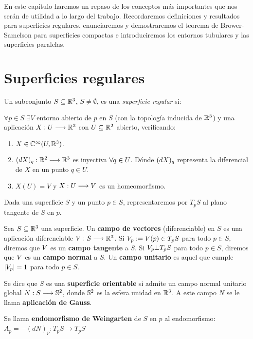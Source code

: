 \label{chapter:preliminary}
En este capítulo haremos un repaso de los conceptos más importantes que nos serán de utilidad a lo largo del trabajo. Recordaremos definiciones y resultados para superficies regulares, enunciaremos y demostraremos el teorema de Brower-Samelson para superficies compactas e introduciremos los entornos tubulares y las superficies paralelas.

\section{Superficies regulares}

\begin{definition}
Un subconjunto $S \subseteq \mathbb{R}^3$, $S \neq \emptyset$, es una \textit{superficie regular} si:

$\forall p \in S$ $\exists V$ entorno abierto de $p$ en $S$ (con la topología inducida de $\mathbb{R}^3$) y una aplicación $X: U \longrightarrow \mathbb{R}^3$ con $U \subseteq \mathbb{R}^2$ abierto, verificando:

\begin{enumerate}
    \item $X \in \mathbb{C}^\infty(U, \mathbb{R}^3)$.
    \item $(dX)_{q}: \mathbb{R}^2 \longrightarrow \mathbb{R}^3$ es inyectiva $\forall q \in U$. Dónde $(dX)_{q}$ representa la diferencial de $X$ en un punto $q \in U$.
    \item $X(U) = V$ y $X:U \longrightarrow V$ es un homeomorfismo.
\end{enumerate}
\end{definition}

Dada una superficie $S$ y un punto $p \in S$, representaremos por $T_pS$ al plano tangente de $S$ en $p$.

Sea $S \subseteq \mathbb{R}^3$ una superficie. Un \textbf{campo de vectores} (diferenciable) en $S$ es una aplicación diferenciable $V: S \longrightarrow \mathbb{R}^3$. Si $V_p := V(p) \in T_p S$ para todo $p \in S$, diremos que $V$ es un \textbf{campo tangente} a $S$. Si $V_p \bot T_p S$ para todo $p \in S$, diremos que $V$ es un \textbf{campo normal} a $S$. Un \textbf{campo unitario} es aquel que cumple $|V_p| = 1$ para todo $p \in S$.

Se dice que $S$ es una \textbf{superficie orientable} si admite un campo normal unitario global $N: S \longrightarrow \mathbb{S}^2$, donde $\mathbb{S}^2$ es la esfera unidad en $\mathbb{R}^3$. A este campo $N$ se le llama \textbf{aplicación de Gauss}.

Se llama \textbf{endomorfismo de Weingarten} de $S$ en $p$ al endomorfismo: $A_p = -(dN)_p: T_pS \longrightarrow T_pS$

